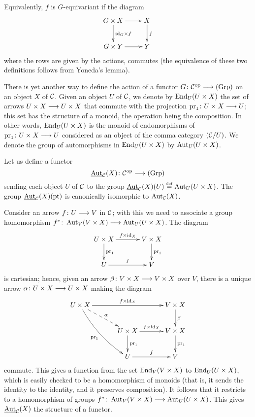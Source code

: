 \begin{2   CONTRAVARIANT FUNCTORS}
\begin{2.2 Group objects}
Equivalently, $f$ is $G$-equivariant if the diagram
   \[
   \xymatrix{
   G \times X \ar[r] \ar[d]^{\id_G \times f}
   &
   X \ar[d]^f\\
   G \times Y \ar[r]&
   Y\\
   }
   \]
where the rows are given by the actions, commutes (the equivalence of these two definitions follows from Yoneda's lemma).

There is yet another way to define the action of a functor $G \colon \cC\op \arr \catgrp$ on an object $X$ of $\mathcal{C}$. Given an object $U$ of $\mathcal{C}$, we denote by $\operatorname{End}_U(U \times X)$ the set of arrows $U \times X \arr U \times X$ that commute with the projection $\pr_1 \colon U \times X \arr U$; this set has the structure of a monoid, the operation being the composition. In other words, $\operatorname{End}_U(U \times X)$ is the monoid of endomorphisms of  $\pr_1 \colon U \times X \arr U$ considered as an object of the comma category $(\mathcal{C}/U)$. We denote the group of automorphisms in $\operatorname{End}_U(U \times X)$ by $\operatorname{Aut}_U(U \times X)$.

Let us define a functor
   \[
   \underaut_{\cC}(X) \colon \cC\op \arr \catgrp
   \]
sending each object $U$ of $\mathcal{C}$ to the group $\mathop{\underline{\mathrm{Aut}}}\nolimits_{\mathcal{C}}(X)(U) \overset{\mathrm{\scriptscriptstyle def}} = \operatorname{Aut}_U(U \times X)$. The group $\mathop{\underline{\mathrm{Aut}}}\nolimits_{\mathcal{C}}(X)(\mathrm{pt})$ is canonically isomorphic to $\operatorname{Aut}_{\mathcal{C}}(X)$.

Consider an arrow $f \colon U \arr V$ in $\mathcal{C}$; with this we need to associate a group homomorphism $f^* \colon \aut_V(V \times X) \arr \aut_U(U \times X)$. The diagram
   \[
   \xymatrix@C+10pt{
   U \times X \ar[r]^{f \times \id_X} \ar[d]^{\pr_1} &
   V \times X \ar[d]^{\pr_1}\\
   U \ar[r]^f & V
   }
   \]
is cartesian; hence, given an arrow $\beta \colon V \times X \arr V \times X$ over $V$, there is a unique arrow $\alpha \colon U \times X \arr U \times X$ making the diagram
   \[
   \xymatrix@C+10pt{
   U \times X
   \ar[rr]^{f \times \id_X} \ar@/_7pt/[rdd]_{\pr_1}
   \ar@{-->}[rd]^{\alpha}
   &&
   V \times X \ar[d]^{\beta}\\
   & U \times X \ar[r]^{f \times \id_X} \ar[d]^{\pr_1} &
   V \times X \ar[d]^{\pr_1}\\
   & U \ar[r]^f & V
   }
   \]
commute. This gives a function from the set $\operatorname{End}_{V}(V \times X)$ to $\operatorname{End}_{U}(U \times X)$, which is easily checked to be a homomorphism of monoids (that is, it sends the identity to the identity, and it preserves composition). It follows that it restricts to a homomorphism of groups $f^* \colon \aut_V(V \times X) \arr \aut_U(U \times X)$. This gives $ \mathop{\underline{\mathrm{Aut}}}\nolimits_{\mathcal{C}}(X)$ the structure of a functor.


\end{2.2 Group objects}
\end{2   CONTRAVARIANT FUNCTORS}
